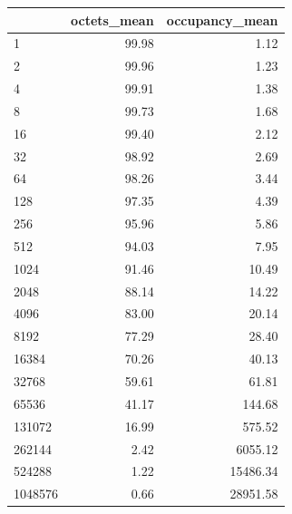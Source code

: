 \begin{tabular}{lrr}
\toprule
 & octets_mean & occupancy_mean \\
\midrule
1 & 99.98 & 1.12 \\
2 & 99.96 & 1.23 \\
4 & 99.91 & 1.38 \\
8 & 99.73 & 1.68 \\
16 & 99.40 & 2.12 \\
32 & 98.92 & 2.69 \\
64 & 98.26 & 3.44 \\
128 & 97.35 & 4.39 \\
256 & 95.96 & 5.86 \\
512 & 94.03 & 7.95 \\
1024 & 91.46 & 10.49 \\
2048 & 88.14 & 14.22 \\
4096 & 83.00 & 20.14 \\
8192 & 77.29 & 28.40 \\
16384 & 70.26 & 40.13 \\
32768 & 59.61 & 61.81 \\
65536 & 41.17 & 144.68 \\
131072 & 16.99 & 575.52 \\
262144 & 2.42 & 6055.12 \\
524288 & 1.22 & 15486.34 \\
1048576 & 0.66 & 28951.58 \\
\bottomrule
\end{tabular}
